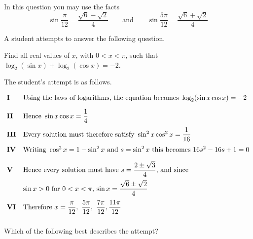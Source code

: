 \documentclass[11pt,a4paper]{article}
\begin{document}
\begin{enumerate}[label=\textbf{\arabic*.},leftmargin=*,itemsep=0pt,start=12]
In this question you may use the facts \[\sin\dfrac{\pi}{12}=\dfrac{\sqrt{6}-\sqrt{2}}{4} \qquad\text{and}\qquad\sin\dfrac{5\pi}{12}=\dfrac{\sqrt{6}+\sqrt{2}}{4}\] \vspace*{5pt}


A student attempts to answer the following question.

\begin{center}
\begin{minipage}{0.82\linewidth}
\centering
Find all real values of $x$, with $0<x<\pi$, such that $\log_{2}(\sin x)+\log_{2}(\cos x)=-2$.
\end{minipage}
\end{center}

The student's attempt is as follows.

\[
\begin{array}{@{}ll@{}}
\textbf{I} & \text{Using the laws of logarithms, the equation becomes } \log_{2}(\sin x\cos x)=-2 \\[10pt]
\textbf{II} & \text{Hence } \sin x\cos x=\dfrac{1}{4} \\[10pt]
\textbf{III} & \text{Every solution must therefore satisfy } \sin^{2}x\cos^{2}x=\dfrac{1}{16} \\[10pt]
\textbf{IV} & \text{Writing}\ \cos^{2}x=1-\sin^{2}x\ \text{and}\ s=\sin^{2}x\text{ this becomes } 16s^{2}-16s+1=0 \\[10pt]
\textbf{V} & \text{Hence every solution must have } s=\dfrac{2\pm\sqrt{3}}{4}\text{, and since}\\[8pt]& \sin x>0\ \text{for}\ 0<x<\pi\text{,}\, \sin x=\dfrac{\sqrt{6}\pm\sqrt{2}}{4} \\[10pt]
\textbf{VI} & \text{Therefore } x=\dfrac{\pi}{12},\ \dfrac{5\pi}{12},\ \dfrac{7\pi}{12},\dfrac{11\pi}{12} \\[10pt]
\end{array}
\]

Which of the following best describes the attempt?


\end{enumerate}
\end{document}
